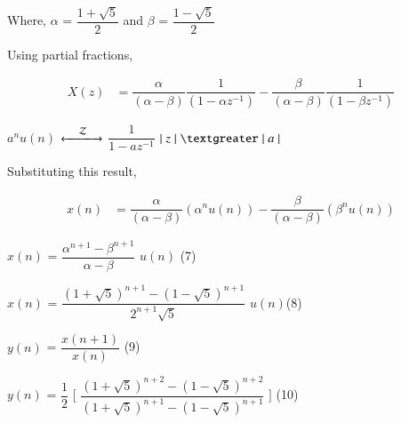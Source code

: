 \documentclass[journal,12pt,twocolumn]{IEEEtran}
\theoremstyle{remark}
\begin{document}
	\vspace{0.3cm}
	
	Where, $\alpha$ = $\dfrac{1 +\sqrt{5}}{2}$ and $\beta$ = $\dfrac{1 -\sqrt{5}}{2}$ 
	
	\vspace{0.4cm}
	
	Using partial fractions,
	
	\begin{align}
		X(z) &= \dfrac{\alpha}{(\alpha - \beta)} \dfrac{1}{(1 - \alpha z^{-1})} - \dfrac{\beta}{(\alpha - \beta)} \dfrac{1}{(1 - \beta z^{-1})} \tag{5}
	\end{align}
	
	$a^n u(n)$
	$\xleftarrow[]{\hspace{0.4cm}{\mathcal{Z}}\hspace{0.1cm}}\xrightarrow[]{}$
	$\dfrac{1}{1 - a z^{-1}}$ \hspace{0.2cm} $\lvert \hspace{0.1cm} z \hspace{0.1cm}\rvert \hspace{0.1cm} \textgreater \hspace{0.1cm} \lvert \hspace{0.1cm} a \hspace{0.1cm} \rvert$
	
	\vspace{0.4cm}
	
	Substituting this result,
	
	\vspace{-0.5cm}
	
	\begin{align}
		x(n) &= \dfrac{\alpha}{(\alpha - \beta)} (\alpha^n u(n)) - \dfrac{\beta}{(\alpha - \beta)} (\beta^n u(n)) \tag{6}
	\end{align}
	
	$x(n)$ = $\dfrac{\alpha^{n+1} - \beta^{n+1} }{\alpha - \beta}$ $u(n)$ \hfill (7)
	
	\vspace{0.6cm}
	
	$x(n)$ = $\dfrac{(1 + \sqrt{5})^{n+1} - (1 - \sqrt{5})^{n+1} }{2^{n+1} \sqrt{5}}$ $u(n)$\hfill (8)
	
	\vspace{0.6cm}
	
	$y(n)$ = $\dfrac{x(n+1)}{x(n)}$ \hfill (9)
	
	\vspace{0.6cm}
	
	$y(n)$ = $\dfrac{1}{2}$ $\Bigg[$ $\dfrac{(1 + \sqrt{5})^{n+2} - (1 - \sqrt{5})^{n+2}}{(1 + \sqrt{5})^{n+1} - (1 - \sqrt{5})^{n+1}}$ $\Bigg]$ \hfill (10)
	
\end{document}
